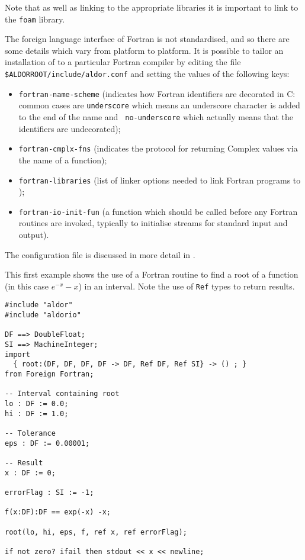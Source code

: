Note that as well as linking to the appropriate \asharp{} libraries it
is important to link to the \verb`foam` library.


The foreign language interface of Fortran is not standardised, and so
there are some details which vary from platform to platform.  It is
possible to tailor an installation of \asharp{} to a particular
Fortran compiler by editing the file
\verb`$ALDORROOT/include/aldor.conf` and setting the values of the
following keys:  
\begin{itemize}
\item {\tt fortran-name-scheme} (indicates how Fortran identifiers are
decorated in C: common cases are {\tt underscore} which means an
underscore character is added to the end of the name and {\tt
no-underscore} which actually means that the identifiers are undecorated);
\item {\tt fortran-cmplx-fns} (indicates the protocol for returning
Complex values via the name of a function);
\item {\tt fortran-libraries} (list of linker options needed to link Fortran
programs to \asharp{});
\item {\tt fortran-io-init-fun} (a function which should be called
before any Fortran routines are invoked, typically to initialise streams
for standard input and output).
\end{itemize}

The configuration file is discussed in more detail in .


This first example shows the use of a Fortran routine to find a root
of a function (in this case $e^{-x}-x$) in an interval.  Note the use
of {\tt Ref} types to return results.

\begin{small}
\begin{verbatim}
#include "aldor"
#include "aldorio"

DF ==> DoubleFloat;
SI ==> MachineInteger;
import
  { root:(DF, DF, DF, DF -> DF, Ref DF, Ref SI} -> () ; }
from Foreign Fortran;

-- Interval containing root
lo : DF := 0.0;
hi : DF := 1.0;

-- Tolerance
eps : DF := 0.00001;

-- Result
x : DF := 0;

errorFlag : SI := -1;

f(x:DF):DF == exp(-x) -x;

root(lo, hi, eps, f, ref x, ref errorFlag);

if not zero? ifail then stdout << x << newline;
\end{verbatim}
\end{small}


